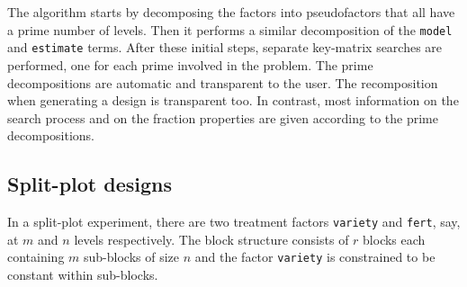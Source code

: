 \documentclass[a4paper]{article}
\begin{document}
The algorithm starts by decomposing the factors into pseudofactors
that all have a prime number of levels. Then it performs a similar
decomposition of the \texttt{model} and \texttt{estimate} terms. After
these initial steps, separate key-matrix searches are performed, one for
each prime involved in the problem. The prime decompositions are
automatic and transparent to the user. The recomposition when
generating a design is transparent too. In contrast, most
information on the search process and on the fraction properties are
given according to the prime decompositions.

\subsection{Split-plot designs}
In a split-plot experiment, there are two treatment factors
\texttt{variety} and \texttt{fert}, say, at $m$ and $n$ levels
respectively. The block structure consists of $r$ blocks each
containing $m$ sub-blocks of size $n$ and the factor \texttt{variety}
is constrained to be constant within sub-blocks. 
\end{document}
